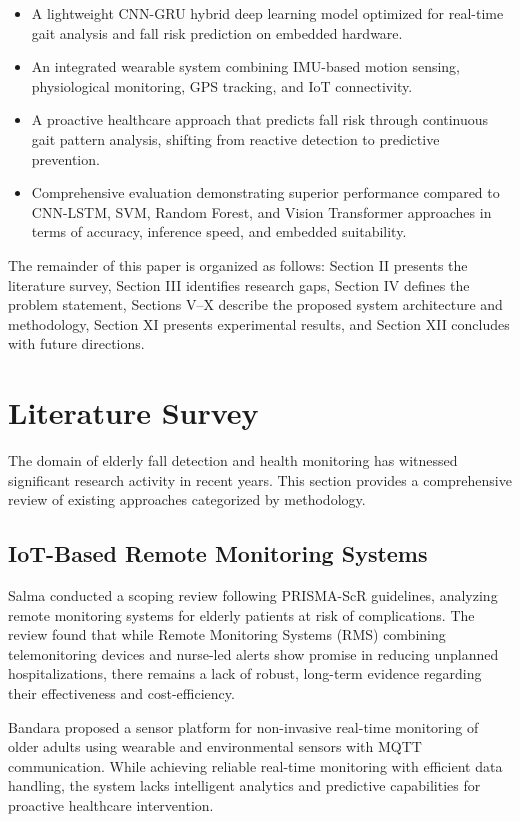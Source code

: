 \documentclass[conference]{IEEEtran}
\begin{document}
\begin{itemize}
    \item A lightweight CNN-GRU hybrid deep learning model optimized for real-time gait analysis and fall risk prediction on embedded hardware.
    \item An integrated wearable system combining IMU-based motion sensing, physiological monitoring, GPS tracking, and IoT connectivity.
    \item A proactive healthcare approach that predicts fall risk through continuous gait pattern analysis, shifting from reactive detection to predictive prevention.
    \item Comprehensive evaluation demonstrating superior performance compared to CNN-LSTM, SVM, Random Forest, and Vision Transformer approaches in terms of accuracy, inference speed, and embedded suitability.
\end{itemize}

The remainder of this paper is organized as follows: Section II presents the literature survey, Section III identifies research gaps, Section IV defines the problem statement, Sections V--X describe the proposed system architecture and methodology, Section XI presents experimental results, and Section XII concludes with future directions.

\section{Literature Survey}

The domain of elderly fall detection and health monitoring has witnessed significant research activity in recent years. This section provides a comprehensive review of existing approaches categorized by methodology.

\subsection{IoT-Based Remote Monitoring Systems}

Salma \cite{salma2025} conducted a scoping review following PRISMA-ScR guidelines, analyzing remote monitoring systems for elderly patients at risk of complications. The review found that while Remote Monitoring Systems (RMS) combining telemonitoring devices and nurse-led alerts show promise in reducing unplanned hospitalizations, there remains a lack of robust, long-term evidence regarding their effectiveness and cost-efficiency.

Bandara \cite{bandara2020} proposed a sensor platform for non-invasive real-time monitoring of older adults using wearable and environmental sensors with MQTT communication. While achieving reliable real-time monitoring with efficient data handling, the system lacks intelligent analytics and predictive capabilities for proactive healthcare intervention.
\end{document}
